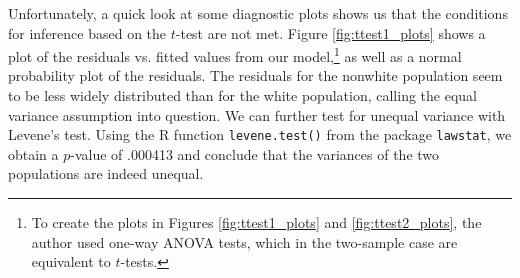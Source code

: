 \par \bigskip Unfortunately, a quick look at some diagnostic plots shows us that the conditions for inference based on the $t$-test are not met. Figure \ref{fig:ttest1_plots} shows a plot of the residuals vs. fitted values from our model,\footnote{To create the plots in Figures \ref{fig:ttest1_plots} and \ref{fig:ttest2_plots}, the author used one-way ANOVA tests, which in the two-sample case are equivalent to $t$-tests.} as well as a normal probability plot of the residuals. The residuals for the nonwhite population seem to be less widely distributed than for the white population, calling the equal variance assumption into question. We can further test for unequal variance with Levene's test. Using the R function \texttt{levene.test()} from the package \texttt{lawstat}, we obtain a $p$-value of .000413 and conclude that the variances of the two populations are indeed unequal.

\vspace{.2in}

